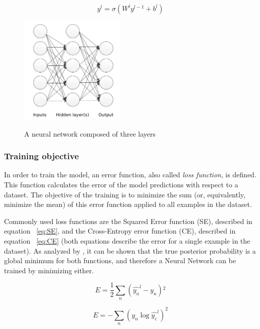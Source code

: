 \begin{equation}
y^{l} = \sigma(W^{l}y^{l-1}+ b^{l}) 
\label{eq:multi}
\end{equation}


\begin{figure}[H]
	\centering
	{\includegraphics[width=0.45\textwidth]{images/mann}}
	\caption{A neural network composed of three layers}
	\label{fig:multi}
\end{figure}

\subsubsection{Training objective} 
In order to train the model, an error function, also called \textit{loss function}, is defined. This function calculates the error of the model predictions with respect to a dataset. The objective of the training is to minimize the sum (or, equivalently, minimize the mean) of this error function applied to all examples in the dataset. 

\indent Commonly used loss functions are the Squared Error function (SE), described in equation ~\ref{eq:SE}, and the Cross-Entropy error function (CE), described in equation ~\ref{eq:CE} (both equations describe the error for a single example in the dataset). As analyzed by \citealt{golik2013cross}, it can be shown that the true posterior probability is a global minimum for both functions, and therefore a Neural Network can be trained by minimizing either. 

\begin{equation}
E = \frac{1}{2} \sum\limits_{n} ( \hat{y_n}^{l} - y_n ){^2}
\label{eq:SE}
\end{equation}

\begin{equation}
E = -\sum\limits_{n}(y_n \log \hat{y_c}^{l})^{2}
\label{eq:CE}
\end{equation}

